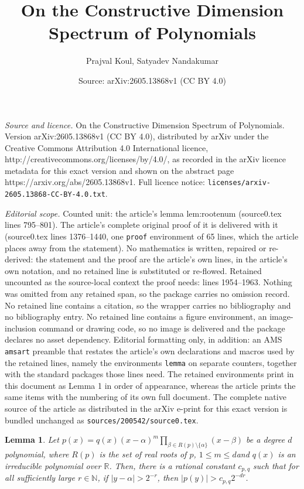 \documentclass[10pt,a4paper]{amsart}
\title{On the Constructive Dimension Spectrum of Polynomials}
\author{Prajval Koul, Satyadev Nandakumar}
\date{Source: arXiv:2605.13868v1 (CC BY 4.0)}
\newtheorem{lemma}{Lemma}
\newcommand{\R}{\mathbb{R}}
\begin{document}
\maketitle

\noindent\emph{Source and licence.} On the Constructive Dimension Spectrum of Polynomials. Version arXiv:2605.13868v1 (CC BY 4.0), distributed by arXiv under the Creative Commons Attribution 4.0 International licence, http://creativecommons.org/licenses/by/4.0/, as recorded in the arXiv licence metadata for this exact version and shown on the abstract page https://arxiv.org/abs/2605.13868v1. Full licence notice: \texttt{licenses/arxiv-2605.13868-CC-BY-4.0.txt}.\par\smallskip

\noindent\textit{Editorial scope.} Counted unit: the article's lemma lem:rootenum (source0.tex lines 795--801). The article's complete original proof of it is delivered with it (source0.tex lines 1376--1440, one \texttt{proof} environment of 65 lines, which the article places away from the statement). No mathematics is written, repaired or re-derived: the statement and the proof are the article's own lines, in the article's own notation, and no retained line is substituted or re-flowed.  Retained uncounted as the source-local context the proof needs: lines 1954--1963.  Nothing was omitted from any retained span, so the package carries no omission record.  No retained line contains a citation, so the wrapper carries no bibliography and no bibliography entry.  No retained line contains a figure environment, an image-inclusion command or drawing code, so no image is delivered and the package declares no asset dependency.  Editorial formatting only, in addition: an AMS \texttt{amsart} preamble that restates the article's own declarations and macros used by the retained lines, namely the environments \texttt{lemma} on separate counters, together with the standard packages those lines need.  The retained environments print in this document as Lemma 1 in order of appearance, whereas the article prints the same items with the numbering of its own full document.  The complete native source of the article as distributed in the arXiv e-print for this exact version is bundled unchanged as \texttt{sources/200542/source0.tex}.
\begin{lemma}
  \label{lem:poly_bound}
  Let
  $p(x) = q(x) (x-\alpha)^m \prod_{\beta \in R(p)\setminus\{\alpha\}}
  (x-\beta)$ be a degree $d$ polynomial, where $R(p)$ is the set of
  real roots of $p$, $1 \le m \le d$and $q(x)$ is an irreducible
  polynomial over $\R$. Then, there is a rational constant $c_{p,q}$
  such that for all sufficiently large $r \in \mathbb{N}$, if
  $|y-\alpha|>2^{-r}$, then $|p(y)|>c_{p,q} 2^{-dr}$.
\end{lemma}
\end{document}
